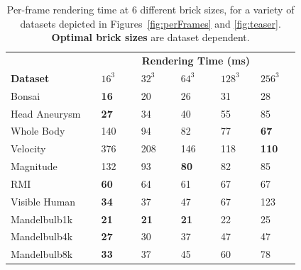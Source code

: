 \begin{table}
  \centering
  \caption{Per-frame rendering time at 6 different brick sizes, for
  a variety of datasets depicted in Figures~\ref{fig:perFrames} and
  \ref{fig:teaser}.  \textbf{Optimal brick sizes} are
  dataset dependent.}
  \label{tbl:timings}

  \begin{tabular*}{\linewidth}{|p{0.25825\linewidth}|p{0.11\linewidth}|p{0.11\linewidth}|p{0.11\linewidth}|p{0.11\linewidth}|p{0.11\linewidth}|}\hline
    & \multicolumn{5}{c|}{\textbf{Rendering Time (ms)}}\\
    \cline{2-6}
    \multicolumn{1}{|l|}{\textbf{Dataset}}
                  & $16^3$ & $32^3$ & $64^3$ & $128^3$ & $256^3$ \\\hline
    Bonsai        & {\bf 16} & 20     & 26         & 31  & 28        \\
    Head Aneurysm & {\bf 27} & 34     & 40         & 55  & 85        \\
    Whole Body    & 140      & 94     & 82         & 77  & {\bf 67}  \\
    Velocity      & 376      & 208    & 146        & 118 & {\bf 110} \\
    Magnitude     & 132      & 93     & {\bf 80}   & 82  & 85        \\
    RMI           & {\bf 60} & 64     & 61         & 67  & 67        \\
    Visible Human & {\bf 34} & 37     & 47         & 67  & 123       \\
    Mandelbulb1k  & {\bf 21} & {\bf 21} & {\bf 21} & 22  & 25        \\
    Mandelbulb4k  & {\bf 27} & 30     & 37         & 47  & 47        \\
    Mandelbulb8k  & {\bf 33} & 37     & 45         & 60  & 78        \\\hline
  \end{tabular*}
\end{table}

